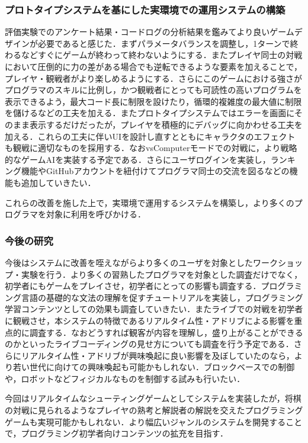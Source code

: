 \subsubsection{プロトタイプシステムを基にした実環境での運用システムの構築}

評価実験でのアンケート結果・コードログの分析結果を鑑みてより良いゲームデザインが必要であると感じた．まずパラメータバランスを調整し，1ターンで終わるなどすぐにゲームが終わって終わないようにする．またプレイヤ同士の対戦において圧倒的に力の差がある場合でも逆転できるような要素を加えることで，プレイヤ・観戦者がより楽しめるようにする．さらにこのゲームにおける強さがプログラマのスキルに比例し，かつ観戦者にとっても可読性の高いプログラムを表示できるよう，最大コード長に制限を設けたり，循環的複雑度の最大値に制限を儲けるなどの工夫を加える．またプロトタイプシステムではエラーを画面にそのまま表示するだけだったが，プレイヤを積極的にデバッグに向かわせる工夫を加える．これらの工夫に伴いUIを設計し直すとともにキャラクタのエフェクトも観戦に適切なものを採用する．なおvsComputerモードでの対戦に，より戦略的なゲームAIを実装する予定である．さらにユーザログインを実装し，ランキング機能やGitHubアカウントを紐付けてプログラマ同士の交流を図るなどの機能も追加していきたい．

これらの改善を施した上で，実環境で運用するシステムを構築し，より多くのプログラマを対象に利用を呼びかける．

\subsubsection{今後の研究}

今後はシステムに改善を咥えながらより多くのユーザを対象としたワークショップ・実験を行う．より多くの習熟したプログラマを対象とした調査だけでなく，初学者にもゲームをプレイさせ，初学者にとっての影響も調査する．プログラミング言語の基礎的な文法の理解を促すチュートリアルを実装し，プログラミング学習コンテンツとしての効果も調査していきたい．またライブでの対戦を初学者に観戦させ，本システムの特徴であるリアルタイム性・アドリブによる影響を重点的に調査する．なおどうすれば観客が内容を理解し，盛り上がることができるのかといったライブコーディングの見せ方についても調査を行う予定である．さらにリアルタイム性・アドリブが興味喚起に良い影響を及ぼしていたのなら，より若い世代に向けての興味喚起も可能かもしれない．ブロックベースでの制御や，ロボットなどフィジカルなものを制御する試みも行いたい．

今回はリアルタイムなシューティングゲームとしてシステムを実装したが，将棋の対戦に見られるようなプレイヤの熟考と解説者の解説を交えたプログラミングゲームも実現可能かもしれない．より幅広いジャンルのシステムを開発することで，プログラミング初学者向けコンテンツの拡充を目指す．



